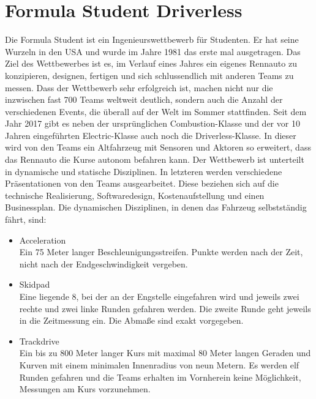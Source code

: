 \documentclass{like}
\begin{document}
\section{Formula Student Driverless}
Die Formula Student ist ein Ingenieurswettbewerb für Studenten. Er hat seine Wurzeln in den USA und wurde im Jahre 1981 das erste mal ausgetragen. Das Ziel des Wettbewerbes ist es, im Verlauf eines Jahres ein eigenes Rennauto zu konzipieren, designen, fertigen und sich schlussendlich mit anderen Teams zu messen. Dass der Wettbewerb sehr erfolgreich ist, machen nicht nur die inzwischen fast 700 Teams weltweit \cite{FsWorldRank:1} deutlich, sondern auch die Anzahl der verschiedenen Events, die überall auf der Welt im Sommer stattfinden. Seit dem Jahr 2017 gibt es neben der ursprünglichen Combustion-Klasse und der vor 10 Jahren eingeführten Electric-Klasse auch noch die Driverless-Klasse.
In dieser wird von den Teams ein Altfahrzeug mit Sensoren und Aktoren so erweitert, dass das Rennauto die Kurse autonom befahren kann.
Der Wettbewerb ist unterteilt in dynamische und statische Disziplinen. In letzteren werden verschiedene Präsentationen von den Teams ausgearbeitet. Diese beziehen sich auf die technische Realisierung, Softwaredesign, Kostenaufstellung und einen Businessplan.
Die dynamischen Disziplinen, in denen das Fahrzeug selbstständig fährt, sind:
\begin{itemize}
	\item Acceleration \\ Ein 75 Meter langer Beschleunigungsstreifen. Punkte werden nach der Zeit, nicht nach der Endgeschwindigkeit vergeben.
	\item Skidpad \\ Eine liegende 8, bei der an der Engstelle eingefahren wird und jeweils zwei rechte und zwei linke Runden gefahren werden. Die zweite Runde geht jeweils in die Zeitmessung ein. Die Abmaße sind exakt vorgegeben.
	\item Trackdrive \\ Ein bis zu 800 Meter langer Kurs mit maximal 80 Meter langen Geraden und Kurven mit einem minimalen Innenradius von neun Metern. Es werden elf Runden gefahren und die Teams erhalten im Vornherein keine Möglichkeit, Messungen am Kurs vorzunehmen.
\end{itemize}
\end{document}
